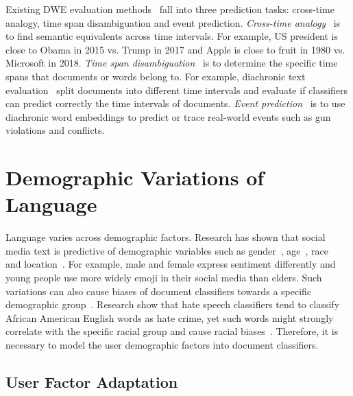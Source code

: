 Existing DWE evaluation methods~\cite{kutuzov2018diachronic} fall into three prediction tasks: cross-time analogy, time span disambiguation and event prediction.
\textit{Cross-time analogy}~\cite{szymanski2017temporal, yao2018dynamic} is to find semantic equivalents across time intervals.
For example, US president is close to Obama in 2015 vs. Trump in 2017 and Apple is close to fruit in 1980 vs. Microsoft in 2018.
\textit{Time span disambiguation}~\cite{mihalcea2012word, popescu2015semeval} is to determine the specific time spans that documents or words belong to. 
For example, diachronic text evaluation~\cite{popescu2015semeval} split documents into different time intervals and evaluate if classifiers can predict correctly the time intervals of documents.
\textit{Event prediction}~\cite{kutuzov2017tracing} is to use diachronic word embeddings to predict or trace real-world events such as gun violations and conflicts.


\section{Demographic Variations of Language}
\label{chap2:sec:demographic}

Language varies across demographic factors. 
Research has shown that social media text is predictive of demographic variables such as 
gender~\cite{rao2010classifying, rao2011hierarchical, burger2011discriminating, volkova2015inferring}, age~\cite{rosenthal2011age, hovy2015tagging,johannsen2015cross, zhang2016predicting, diaz2018addressing}, race~\cite{preoctiuc2018user} and location~\cite{EisensteinEtAl10,wing2011simple,wing2014hierarchical}.
For example, male and female express sentiment differently and young people use more widely emoji in their social media than elders.
Such variations can also cause biases of document classifiers towards a specific demographic group~\cite{sun2019mitigating}.
Research show that hate speech classifiers tend to classify African American English words as hate crime, yet such words might strongly correlate with the specific racial group and cause racial biases~\cite{davidson2019racial, sap2019risk}.
Therefore, it is necessary to model the user demographic factors into document classifiers.


\subsection{User Factor Adaptation}

